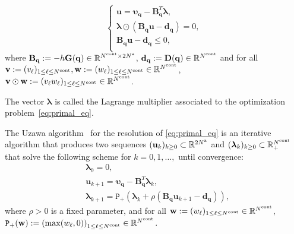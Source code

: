 \begin{equation}
\left\{
\begin{array}{l}
\mathbf{u} = \boldsymbol{\upsilon}_{\mathbf{q}} - \mathbf{B}_{\mathbf{q}}^T \boldsymbol{\lambda},\\
\boldsymbol{\lambda} \odot (\mathbf{B}_{\mathbf{q}}\mathbf{u} - \mathbf{d}_{\mathbf{q}}) = 0,\\
\mathbf{B}_{\mathbf{q}}\mathbf{u} - \mathbf{d}_{\mathbf{q}} \leq 0, \\
\end{array}
\right.
\label{eq:DCP}
\end{equation}
where $\mathbf{B}_{\mathbf{q}}:=-h\mathbf{G}(\mathbf{q}) \in \mathbb{R}^{N^{\rm cont}\times 2N^{\rm a}}$, 
 $\mathbf{d}_{\mathbf{q}}:= \mathbf{D}(\mathbf{q})\in \mathbb{R}^{N^{\rm cont}}$ and for all $\mathbf{v}:= (v_{\ell})_{1\leq \ell \leq N^{\rm cont}}, \mathbf{w}:= (w_{\ell})_{1\leq \ell \leq N^{\rm cont}} \in \mathbb{R}^{N^{\rm cont}}$, $\mathbf{v} \odot \mathbf{w} := (v_\ell w_\ell)_{1\leq \ell \leq N^{\rm cont}} \in \mathbb{R}^{N^{\rm cont}}$.


The vector $\boldsymbol{\lambda}$ is called the Lagrange multiplier associated to the optimization problem~\eqref{eq:primal_eq}.

\medskip

The Uzawa algorithm~\cite{kepleruzawa} for the resolution of \eqref{eq:primal_eq} is an iterative algorithm that produces two sequences $(\mathbf{u}_k)_{k\geq 0} \subset \mathbb{R}^{2N^{\rm a}}$ and $(\boldsymbol{\lambda}_k)_{k\geq 0}
\subset \mathbb{R}_+^{
N^{\rm cont}}$ that solve the following scheme for $k=0,1,\ldots, $ until convergence:
\begin{subequations}
\begin{align}
	& \boldsymbol{\lambda}_0=0,\\
	&\mathbf{u}_{k+1}=\boldsymbol{\upsilon}_{\mathbf{q}}-\mathbf{B}_{\mathbf{q}}^T\boldsymbol{\lambda}_k
 \label{eq:Uzawa_u},\\
	&\boldsymbol{\lambda}_{k+1}=\texttt{P}_{+}
	\left(\boldsymbol{\lambda}_{k}+ \rho (\mathbf{B}_{\mathbf{q}} \mathbf{u}_{k+1}-\mathbf{d}_{\mathbf{q}})
	\right),
 \label{eq:Uzawa_lambda}
\end{align}
\label{eq:discr_Uzawa_system}
\end{subequations}
where $\rho>0$ is a fixed parameter, and for all $\mathbf{w}:= (w_{\ell})_{1\leq \ell \leq N^{\rm cont}} \in \mathbb{R}^{N^{\rm cont}}$, $\texttt{P}_+ (\mathbf{w}) :=\left(\max(w_\ell,0)\right)_{1\leq \ell \leq N^{\rm cont}}\in \mathbb{R}^{N^{\rm cont}}$. 


